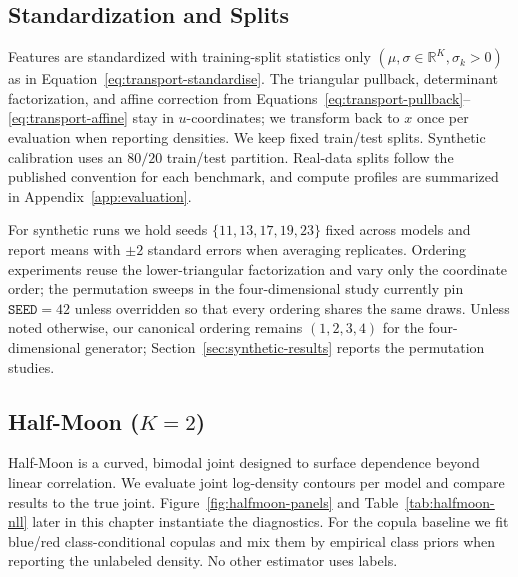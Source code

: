 \documentclass[11pt,a4paper,twoside]{book}\usepackage[]{graphicx}\usepackage[]{xcolor}
\begin{document}
\subsection{Standardization and Splits}
Features are standardized with training-split statistics only $(\mu, \sigma \in \mathbb{R}^K, \sigma_k > 0)$ as in Equation~\eqref{eq:transport-standardise}. The triangular pullback, determinant factorization, and affine correction from Equations~\eqref{eq:transport-pullback}--\eqref{eq:transport-affine} stay in $u$-coordinates; we transform back to $x$ once per evaluation when reporting densities. We keep fixed train/test splits. Synthetic calibration uses an $80/20$ train/test partition. Real-data splits follow the published convention for each benchmark, and compute profiles are summarized in Appendix~\ref{app:evaluation}.

For synthetic runs we hold seeds $\{11, 13, 17, 19, 23\}$ fixed across models and report means with $\pm 2$ standard errors when averaging replicates. Ordering experiments reuse the lower-triangular factorization and vary only the coordinate order; the permutation sweeps in the four-dimensional study currently pin $\texttt{SEED}=42$ unless overridden so that every ordering shares the same draws. Unless noted otherwise, our canonical ordering remains $(1,2,3,4)$ for the four-dimensional generator; Section~\ref{sec:synthetic-results} reports the permutation studies.

\subsection{Half-Moon ($K=2$)}
Half-Moon is a curved, bimodal joint designed to surface dependence beyond linear correlation. We evaluate joint log-density contours per model and compare results to the true joint. Figure~\ref{fig:halfmoon-panels} and Table~\ref{tab:halfmoon-nll} later in this chapter instantiate the diagnostics. For the copula baseline we fit blue/red class-conditional copulas and mix them by empirical class priors when reporting the unlabeled density. No other estimator uses labels.
\end{document}
